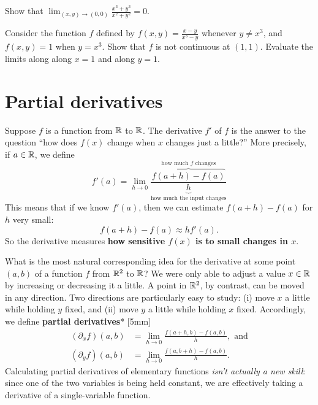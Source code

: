 \documentclass{watsonbook}
\begin{document}
  \begin{exercise}{}{}
    Show that $\displaystyle{\lim_{(x,y) \to (0,0)} \frac{x^3 + y^3}{x^2 + y^2}} =
    0$. 
  \end{exercise}

  \begin{exercise}{}{}
    Consider the function $f$ defined by $f(x,y) = \frac{x-y}{x^3-y}$
    whenever $y \neq x^3$, and $f(x,y) = 1$ when $y = x^3$. Show that
    $f$ is not continuous at $(1,1)$. Evaluate the limits along along
    $x=1$ and along $y=1$.
  \end{exercise}

  \section{Partial derivatives} \label{sec:partial}



  Suppose $f$ is a function from $\mathbb{R}$ to $\mathbb{R}$. The derivative $f'$ of
  $f$ is the answer to the question ``how does $f(x)$ change when $x$
  changes just a little?'' More precisely, if $a\in \mathbb{R}$, we define
  \[
    f'(a) = \lim_{h \to 0} \frac{\overbrace{f(a+h)-f(a)}^{\text{how
          much $f$ changes}}}{\underbrace{h}_{\text{how much the input
          changes}}}
  \]
  This means that if we know $f'(a)$, then we can estimate
  $f(a+h) - f(a)$ for $h$ very small:
  \[
    f(a+h) - f(a) \approx h
    f'(a). 
  \]
  So the derivative measures \textbf{how sensitive $f(x)$ is to small
    changes in $x$}.
  
  What is the most natural corresponding idea for the derivative at
  some point $(a,b)$ of a function $f$ from $\mathbb{R}^2$ to $\mathbb{R}$? We were
  only able to adjust a value $x\in \mathbb{R}$ by increasing or decreasing it
  a little. A point in $\mathbb{R}^2$, by contrast, can be moved in any
  direction. Two directions are particularly easy to study: (i) move
  $x$ a little while holding $y$ fixed, and (ii) move $y$ a little
  while holding $x$ fixed. Accordingly, we define \textbf{partial
    derivatives}* [5mm]
  \begin{align*}
    (\partial_x f)(a,b) &= \lim_{h \to 0}\frac{f(a+h,b) - f(a,b)}{h},
                          \text{ and} \\
    (\partial_y f)(a,b) &= \lim_{h \to 0}\frac{f(a,b+h) - f(a,b)}{h}. 
  \end{align*}
  Calculating partial derivatives of elementary functions \textit{isn't
  actually a new skill}: since one of the two
  variables is being held constant, we are effectively taking a
  derivative of a single-variable function.
\end{document}

